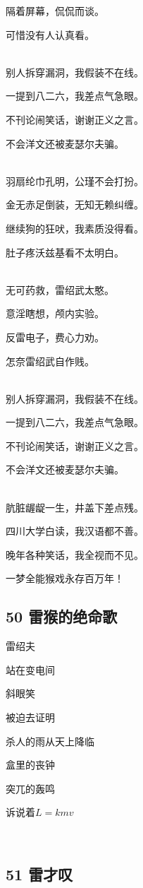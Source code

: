 隔着屏幕，侃侃而谈。

可惜没有人认真看。

~\\
别人拆穿漏洞，我假装不在线。

一提到八二六，我差点气急眼。

不刊论闹笑话，谢谢正义之言。

不会洋文还被麦瑟尔夫骗。

~\\
羽扇纶巾孔明，公瑾不会打扮。

金无赤足倒装，无知无赖纠缠。

继续狗的狂吠，我素质没得看。

肚子疼沃兹基看不太明白。

~\\
无可药救，雷绍武太憨。

意淫瞎想，颅内实验。

反雷电子，费心力劝。

怎奈雷绍武自作贱。

~\\
别人拆穿漏洞，我假装不在线。

一提到八二六，我差点气急眼。

不刊论闹笑话，谢谢正义之言。

不会洋文还被麦瑟尔夫骗。

~\\
肮脏龌龊一生，井盖下差点残。

四川大学白读，我汉语都不善。

晚年各种笑话，我全视而不见。

一梦全能猴戏永存百万年！

\hypertarget{ux96f7ux7334ux7684ux7eddux547dux6b4c}{%
\subsection{50
雷猴的绝命歌}\label{ux96f7ux7334ux7684ux7eddux547dux6b4c}}

雷绍夫

站在变电间

斜眼笑

被迫去证明

杀人的雨从天上降临

盒里的丧钟

突兀的轰鸣

诉说着\(L=kmv\)

~\\

\hypertarget{ux96f7ux624dux53f9}{%
\subsection{51 雷才叹}\label{ux96f7ux624dux53f9}}

